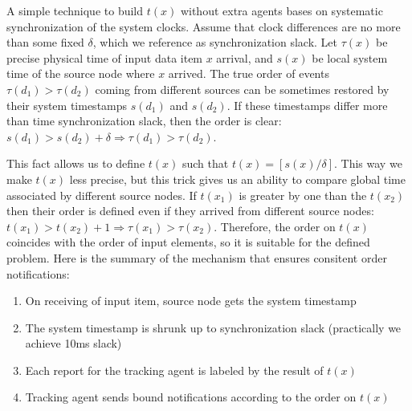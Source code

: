A simple technique to build $t(x)$ without extra agents bases on systematic synchronization of the system clocks. Assume that clock differences are no more than some fixed $\delta$, which we reference as synchronization slack. Let $\tau(x)$ be precise physical time of input data item $x$ arrival, and $s(x)$ be local system time of the source node where $x$ arrived. The true order of events $\tau(d_1) > \tau(d_2)$ coming from different sources can be sometimes restored by their system timestamps $s(d_1)$ and $s(d_2)$. If these timestamps differ more than time synchronization slack, then the order is clear: $s(d_1) > s(d_2) + \delta \Rightarrow \tau(d_1) > \tau(d_2)$.

This fact allows us to define $t(x)$ such that $t(x) = [s(x) / \delta]$. This way we make $t(x)$ less precise, but this trick gives us an ability to compare global time associated by different source nodes. If $t(x_1)$ is greater by one than the $t(x_2)$ then their order is defined even if they arrived from different source nodes:  $t(x_1) > t(x_2) + 1 \Rightarrow \tau(x_1) > \tau(x_2)$. Therefore, the order on $t(x)$ coincides with the order of input elements, so it is suitable for the defined problem. Here is the summary of the mechanism that ensures consitent order notifications:
\begin{enumerate}
    \item On receiving of input item, source node gets the system timestamp
    \item The system timestamp is shrunk up to synchronization slack (practically we achieve 10ms slack)
    \item Each report for the tracking agent is labeled by the result of $t(x)$
    \item Tracking agent sends bound notifications according to the order on $t(x)$
\end{enumerate}



